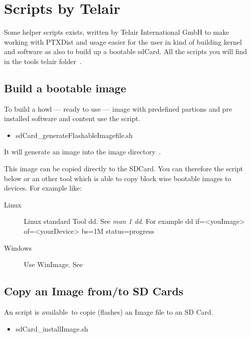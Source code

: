 \chapter{Scripts by Telair}%
\label{cha:scripts}


Some helper scripts exists, written by Telair International GmbH to make working
with PTXDist and usage easier for the user in kind of building kernel and
software as also to build up a bootable sdCard. All the scripts you will find in
the tools telair folder~\footnotemark[1].

\section{Build a bootable image }%
\label{sec:build_image_script}
To build a howl --- ready to use --- image with predefined partions and pre
installed software and content use the script.

\begin{itemize}
    \item   sdCard\_generateFlashableImagefile.sh
\end{itemize}

It will generate an image into the image directory~\footnotemark[2].

This image can be copied directly to the SDCard. You can therefore the
script below or an other tool which is able to copy block wise bootable images
to devices. For example like:

\begin{description}
    \item[Linux] Linux standard Tool dd. See \textit{man 1 dd}. For example
        dd if=<youImage> of=<yourDevice> bs=1M status=progress
\item[Windows] Use WinImage. See~\cite{win32DiskImager}
\end{description}


\section{Copy an Image from/to SD Cards}%
\label{sec:sdCard_flashImage}
An script is available~\footnotemark[1] to copie (flashes) an Image file to an
SD Card.

\begin{itemize}
    \item sdCard\_installImage.sh
\end{itemize}


